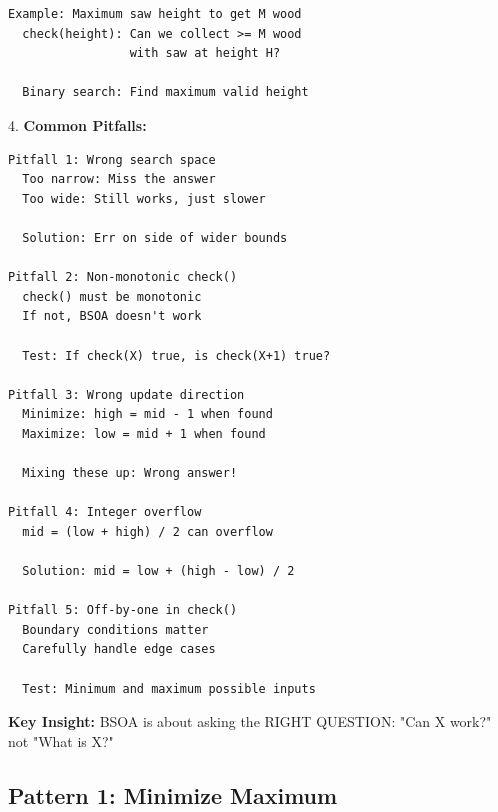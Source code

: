 \documentclass[11pt,a4paper,oneside]{book}
\begin{document}
\begin{tcolorbox}[
    enhanced,breakable,
    colback=white,
    colframe=deepblue,
    boxrule=1.5pt,
    arc=3mm,
    title=\textbf{The BSOA Paradigm: A Complete Revolution}
]
\begin{verbatim}
Example: Maximum saw height to get M wood
  check(height): Can we collect >= M wood
                 with saw at height H?
  
  Binary search: Find maximum valid height
\end{verbatim}

4. \textbf{Common Pitfalls:}
\begin{verbatim}
Pitfall 1: Wrong search space
  Too narrow: Miss the answer
  Too wide: Still works, just slower
  
  Solution: Err on side of wider bounds

Pitfall 2: Non-monotonic check()
  check() must be monotonic
  If not, BSOA doesn't work
  
  Test: If check(X) true, is check(X+1) true?

Pitfall 3: Wrong update direction
  Minimize: high = mid - 1 when found
  Maximize: low = mid + 1 when found
  
  Mixing these up: Wrong answer!

Pitfall 4: Integer overflow
  mid = (low + high) / 2 can overflow
  
  Solution: mid = low + (high - low) / 2

Pitfall 5: Off-by-one in check()
  Boundary conditions matter
  Carefully handle edge cases
  
  Test: Minimum and maximum possible inputs
\end{verbatim}

\textbf{Key Insight:}
BSOA is about asking the RIGHT QUESTION: "Can X work?" not "What is X?"
\end{tcolorbox}

\subsection{Pattern 1: Minimize Maximum}
\end{document}
